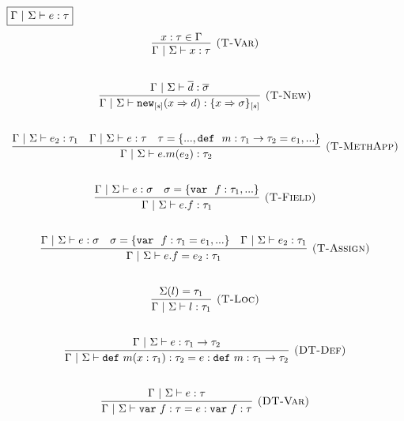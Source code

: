 \documentclass{llncs}
\newcommand{\keywadj}[1]{\mathtt{#1}}
\newcommand{\keyw}[1]{\keywadj{#1}~}
\begin{document}
$\fbox{$\Gamma~|~\Sigma \vdash e : \tau$}$
\[
\begin{array}{c}
\infer[\textsc{(T-Var)}]
  {\Gamma~|~\Sigma \vdash x : \tau}
  {x : \tau \in \Gamma}\\[5ex]

\infer[\textsc{(T-New)}]
	{\Gamma~|~\Sigma \vdash\keywadj{new}_{[s]}(x \Rightarrow d) : \{ x \Rightarrow \sigma \}_{[s]}}
	{\Gamma~|~\Sigma \vdash \overline{d} : \overline{\sigma}} \\[5ex]

\infer[\textsc{(T-MethApp)}]
	{\Gamma~|~\Sigma \vdash  e.m(e_2) : \tau_2} 
	{\Gamma~|~\Sigma \vdash e_2 : \tau_1 & \Gamma~|~\Sigma \vdash e : \tau & \tau=\{..., \keyw{def}~ m : \tau_1 \rightarrow \tau_2 = e_1, ... \} }\\[5ex]

%

\infer[\textsc{(T-Field)}]
	{\Gamma~|~\Sigma \vdash  e.f : \tau_1} 
	{\Gamma~|~\Sigma \vdash e:\sigma & \sigma= \{\keyw{var}~ f : \tau_1,... \} }\\[5ex]

\infer[\textsc{(T-Assign)}]
	{\Gamma~|~\Sigma \vdash  e.f=e_2 : \tau_1} 
	{\Gamma~|~\Sigma \vdash e : \sigma & \sigma= \{\keyw{var}~ f:\tau_1=e_1,... \} & \Gamma~|~\Sigma \vdash e_2 : \tau_1 }\\[5ex]

\infer[\textsc{(T-Loc)}]
  {\Gamma~|~\Sigma \vdash l : \tau_1}
  {\Sigma(l) = \tau_1}\\[5ex]

\infer[\textsc{(DT-Def)}]
  {\Gamma~|~\Sigma \vdash \keyw{def} m(x : \tau_1) : \tau_2 = e : \keyw{def} m : \tau_1 \rightarrow \tau_2}
  {\Gamma~|~\Sigma \vdash e : \tau_1 \rightarrow \tau_2}\\[5ex]

\infer[\textsc{(DT-Var)}]
  {\Gamma~|~\Sigma \vdash \keyw{var} f : \tau = e : \keyw{var} f : \tau}
  {\Gamma~|~\Sigma \vdash e : \tau}\\[5ex]

%

\end{array}
\]
\end{document}
